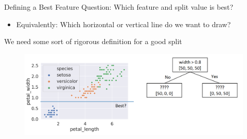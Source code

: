 \documentclass[aspectratio=169]{../latex_main/tntbeamer}  %
\begin{document}
	
	\begin{frame}{Defining a Best Feature}
	    Question: Which feature and split value is best?
	    \begin{itemize}
	        \item  Equivalently: Which horizontal or vertical line do we want to draw?
	    \end{itemize}
	    We need some sort of rigorous definition for a good split
	    \begin{figure}
	        \centering
	        \includegraphics[scale=.4]{Bild46}
	    \end{figure}
	\end{frame}
	
	
	
\end{document}
